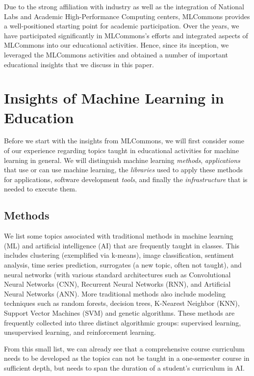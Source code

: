 \documentclass[utf8]{FrontiersinVancouver} %
\begin{document}
Due to the strong affiliation with industry as well as the integration
of National Labs and Academic High-Performance Computing centers,
MLCommons provides a well-positioned starting point for academic
participation. Over the years, we have participated significantly in
MLCommons's efforts and integrated aspects of MLCommons into our
educational activities. Hence, since its inception, we leveraged the
MLCommons activities and obtained a number of important educational
insights that we discuss in this paper.

\section{Insights of Machine Learning in Education}
\label{sec:edu-ml}

Before we start with the insights from MLCommons, we will first
consider some of our experience regarding topics taught in educational
activities for machine learning in general. We will distinguish
machine learning {\em methods}, {\em applications} that use or can use
machine learning, the {\em libraries} used to apply these methods for
applications, software development {\em tools}, and finally the {\em
  infrastructure} that is needed to execute them.


\subsection{Methods}

We list some topics associated with traditional methods in machine
learning (ML) and artificial intelligence (AI) that are frequently
taught in classes. This includes clustering (exemplified via k-means),
image classification, sentiment analysis, time series prediction,
surrogates (a new topic, often not taught), and neural networks (with
various standard architectures such as Convolutional Neural Networks
(CNN), Recurrent Neural Networks (RNN), and Artificial Neural Networks
(ANN).  More traditional methods also include modeling techniques such
as random forests, decision trees, K-Nearest Neighbor (KNN), Support
Vector Machines (SVM) and genetic algorithms.  These methods are
frequently collected into three distinct algorithmic groups:
supervised learning, unsupervised learning, and reinforcement
learning.

From this small list, we can already see that a comprehensive course
curriculum needs to be developed as the topics can not be taught in a
one-semester course in sufficient depth, but needs to span the
duration of a student's curriculum in AI.
\end{document}
